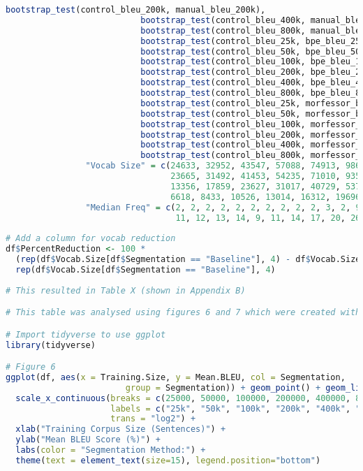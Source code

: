 \documentclass[11pt]{article}
\begin{document}
\begin{lstlisting}[language=R]
                           bootstrap_test(control_bleu_200k, manual_bleu_200k),
                           bootstrap_test(control_bleu_400k, manual_bleu_400k),
                           bootstrap_test(control_bleu_800k, manual_bleu_800k),
                           bootstrap_test(control_bleu_25k, bpe_bleu_25k),
                           bootstrap_test(control_bleu_50k, bpe_bleu_50k),
                           bootstrap_test(control_bleu_100k, bpe_bleu_100k),
                           bootstrap_test(control_bleu_200k, bpe_bleu_200k),
                           bootstrap_test(control_bleu_400k, bpe_bleu_400k),
                           bootstrap_test(control_bleu_800k, bpe_bleu_800k),
                           bootstrap_test(control_bleu_25k, morfessor_bleu_25k),
                           bootstrap_test(control_bleu_50k, morfessor_bleu_50k),
                           bootstrap_test(control_bleu_100k, morfessor_bleu_100k),
                           bootstrap_test(control_bleu_200k, morfessor_bleu_200k),
                           bootstrap_test(control_bleu_400k, morfessor_bleu_400k),
                           bootstrap_test(control_bleu_800k, morfessor_bleu_800k)),
                "Vocab Size" = c(24633, 32952, 43547, 57088, 74913, 98626, 
                                 23665, 31492, 41453, 54235, 71010, 93521, 
                                 13356, 17859, 23627, 31017, 40729, 53709,
                                 6618, 8433, 10526, 13014, 16312, 19696),
                "Median Freq" = c(2, 2, 2, 2, 2, 2, 2, 2, 2, 2, 3, 2, 9, 10, 
                                  11, 12, 13, 14, 9, 11, 14, 17, 20, 26))
                                  
# Add a column for vocab reduction
df$PercentReduction <- 100 * 
  (rep(df$Vocab.Size[df$Segmentation == "Baseline"], 4) - df$Vocab.Size) / 
  rep(df$Vocab.Size[df$Segmentation == "Baseline"], 4)
  
# This resulted in Table X (shown in Appendix B)

# This table was analysed using figures 6 and 7 which were created with the following code

# Import tidyverse to use ggplot
library(tidyverse)

# Figure 6
ggplot(df, aes(x = Training.Size, y = Mean.BLEU, col = Segmentation,
                        group = Segmentation)) + geom_point() + geom_line() +
  scale_x_continuous(breaks = c(25000, 50000, 100000, 200000, 400000, 800000),
                     labels = c("25k", "50k", "100k", "200k", "400k", "800k"),
                     trans = "log2") + 
  xlab("Training Corpus Size (Sentences)") +
  ylab("Mean BLEU Score (%)") +
  labs(color = "Segmentation Method:") +
  theme(text = element_text(size=15), legend.position="bottom")
  

\end{lstlisting}
\end{document}
